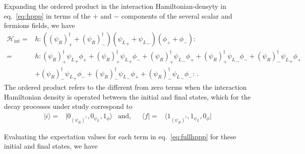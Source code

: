 \begin{frame}
Expanding the ordered product in the interaction Hamiltonian-densyty in eq.~\eqref{eq:hppp} in terms of the  $+$ and $-$ components of the several scalar and fermions fields, we have
\begin{align}
\label{eq:fullhppp}
 \mathcal{H}_{ \text{int}}=&h:\left( (\psi_R)^{\dagger}_{+}+(\psi_R)^{\dagger}_{-}\right) \left( {\psi_L}_{+}+{\psi_L}_{-}\right) \left( \phi_{+}+\phi_{-}\right):\nonumber\\
=&h:
(\psi_R)^{\dagger}_{+}{\psi_L}_{+}\phi_{+}+ 
(\psi_R)^{\dagger}_{+}{\psi_L}_{+}\phi_{-}+ 
(\psi_R)^{\dagger}_{+}{\psi_L}_{-}\phi_{+}+ 
(\psi_R)^{\dagger}_{+}{\psi_L}_{-}\phi_{-}+ 
(\psi_R)^{\dagger}_{-}{\psi_L}_{+}\phi_{+}\nonumber\\ 
&+(\psi_R)^{\dagger}_{-}{\psi_L}_{+}\phi_{-}+ 
(\psi_R)^{\dagger}_{-}{\psi_L}_{-}\phi_{+}+ 
(\psi_R)^{\dagger}_{-}{\psi_L}_{-}\phi_{-} 
:\,.
\end{align}
The ordered product refers to the different from zero terms when the interaction Hamiltonian density is operated between the initial and final states, which for the decay processes under study correspond to
\begin{align}
  |i\rangle=&|0_{(\psi_R)^{\dagger}},0_{{\psi_L}},1_{\phi}\rangle & \text{and,} && \langle f|=&\langle 1_{(\psi_R)^{\dagger}},1_{{\psi_L}},0_\phi|
\end{align}
\end{frame}
Evaluating the expectation values for each term in eq.~\eqref{eq:fullhppp} for these initial and final states, we have
